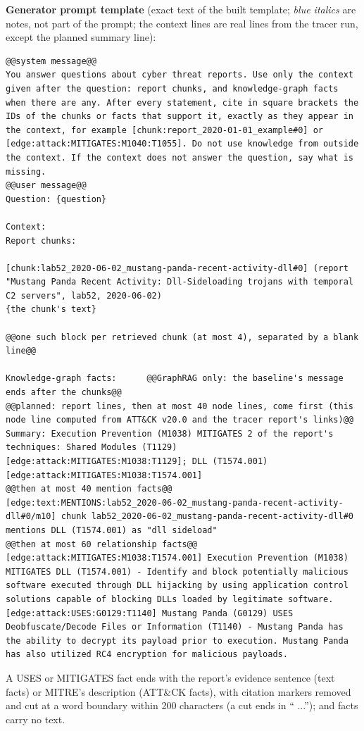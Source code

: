 \documentclass[10pt]{article}
\begin{document}
\textbf{Generator prompt template} (exact text of the built template; \textcolor{accent}{\textsf{\textit{blue italics}}} are notes, not part of the prompt; the context lines are real lines from the tracer run, except the planned summary line):
\begin{lstlisting}
@@system message@@
You answer questions about cyber threat reports. Use only the context given after the question: report chunks, and knowledge-graph facts when there are any. After every statement, cite in square brackets the IDs of the chunks or facts that support it, exactly as they appear in the context, for example [chunk:report_2020-01-01_example#0] or [edge:attack:MITIGATES:M1040:T1055]. Do not use knowledge from outside the context. If the context does not answer the question, say what is missing.
@@user message@@
Question: {question}

Context:
Report chunks:

[chunk:lab52_2020-06-02_mustang-panda-recent-activity-dll#0] (report "Mustang Panda Recent Activity: Dll-Sideloading trojans with temporal C2 servers", lab52, 2020-06-02)
{the chunk's text}

@@one such block per retrieved chunk (at most 4), separated by a blank line@@

Knowledge-graph facts:      @@GraphRAG only: the baseline's message ends after the chunks@@
@@planned: report lines, then at most 40 node lines, come first (this node line computed from ATT&CK v20.0 and the tracer report's links)@@
Summary: Execution Prevention (M1038) MITIGATES 2 of the report's techniques: Shared Modules (T1129) [edge:attack:MITIGATES:M1038:T1129]; DLL (T1574.001) [edge:attack:MITIGATES:M1038:T1574.001]
@@then at most 40 mention facts@@
[edge:text:MENTIONS:lab52_2020-06-02_mustang-panda-recent-activity-dll#0/m10] chunk lab52_2020-06-02_mustang-panda-recent-activity-dll#0 mentions DLL (T1574.001) as "dll sideload"
@@then at most 60 relationship facts@@
[edge:attack:MITIGATES:M1038:T1574.001] Execution Prevention (M1038) MITIGATES DLL (T1574.001) - Identify and block potentially malicious software executed through DLL hijacking by using application control solutions capable of blocking DLLs loaded by legitimate software.
[edge:attack:USES:G0129:T1140] Mustang Panda (G0129) USES Deobfuscate/Decode Files or Information (T1140) - Mustang Panda has the ability to decrypt its payload prior to execution. Mustang Panda has also utilized RC4 encryption for malicious payloads.
\end{lstlisting}
A USES or MITIGATES fact ends with the report's evidence sentence (text facts) or MITRE's description (ATT\&CK facts), with citation markers removed and cut at a word boundary within 200 characters (a cut ends in `` ...'');  and  facts carry no text.
\end{document}
